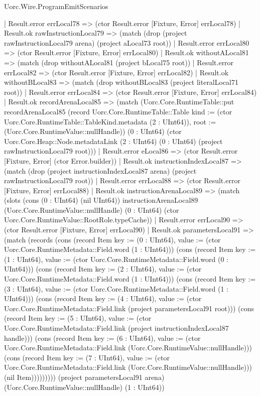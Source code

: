 \begin{lexlean}{Uorc.Wire.ProgramEmitScenarios}
\begin{semanticmodule}
{              | Result.error errLocal78 => (ctor Result.error [Fixture, Error] errLocal78)
              | Result.ok rawInstructionLocal79 => (match (drop (project rawInstructionLocal79 arena) (project aLocal73 root))
                | Result.error errLocal80 => (ctor Result.error [Fixture, Error] errLocal80)
                | Result.ok withoutALocal81 => (match (drop withoutALocal81 (project bLocal75 root))
                  | Result.error errLocal82 => (ctor Result.error [Fixture, Error] errLocal82)
                  | Result.ok withoutBLocal83 => (match (drop withoutBLocal83 (project literalLocal71 root))
                    | Result.error errLocal84 => (ctor Result.error [Fixture, Error] errLocal84)
                    | Result.ok recordArenaLocal85 => (match (Uorc.Core.RuntimeTable::put recordArenaLocal85 (record Uorc.Core.RuntimeTable::Table {kind := (ctor Uorc.Core.RuntimeTable::TableKind.metadata (2 : UInt64)), root := (Uorc.Core.RuntimeValue::nullHandle)}) (0 : UInt64) (ctor Uorc.Core.Heap::Node.metadataLink (2 : UInt64) (0 : UInt64) (project rawInstructionLocal79 root)))
                      | Result.error eLocal86 => (ctor Result.error [Fixture, Error] (ctor Error.builder))
                      | Result.ok instructionIndexLocal87 => (match (drop (project instructionIndexLocal87 arena) (project rawInstructionLocal79 root))
                        | Result.error errLocal88 => (ctor Result.error [Fixture, Error] errLocal88)
                        | Result.ok instructionArenaLocal89 => (match (slots (cons (0 : UInt64) (nil UInt64)) instructionArenaLocal89 (Uorc.Core.RuntimeValue::nullHandle) (0 : UInt64) (ctor Uorc.Core.RuntimeValue::RootRole.typeCache))
                          | Result.error errLocal90 => (ctor Result.error [Fixture, Error] errLocal90)
                          | Result.ok parametersLocal91 => (match (records (cons (record Item {key := (0 : UInt64), value := (ctor Uorc.Core.RuntimeMetadata::Field.word (1 : UInt64))}) (cons (record Item {key := (1 : UInt64), value := (ctor Uorc.Core.RuntimeMetadata::Field.word (0 : UInt64))}) (cons (record Item {key := (2 : UInt64), value := (ctor Uorc.Core.RuntimeMetadata::Field.word (1 : UInt64))}) (cons (record Item {key := (3 : UInt64), value := (ctor Uorc.Core.RuntimeMetadata::Field.word (1 : UInt64))}) (cons (record Item {key := (4 : UInt64), value := (ctor Uorc.Core.RuntimeMetadata::Field.link (project parametersLocal91 root))}) (cons (record Item {key := (5 : UInt64), value := (ctor Uorc.Core.RuntimeMetadata::Field.link (project instructionIndexLocal87 handle))}) (cons (record Item {key := (6 : UInt64), value := (ctor Uorc.Core.RuntimeMetadata::Field.link (Uorc.Core.RuntimeValue::nullHandle))}) (cons (record Item {key := (7 : UInt64), value := (ctor Uorc.Core.RuntimeMetadata::Field.link (Uorc.Core.RuntimeValue::nullHandle))}) (nil Item))))))))) (project parametersLocal91 arena) (Uorc.Core.RuntimeValue::nullHandle) (1 : UInt64))
}
\end{semanticmodule}
\end{lexlean}
